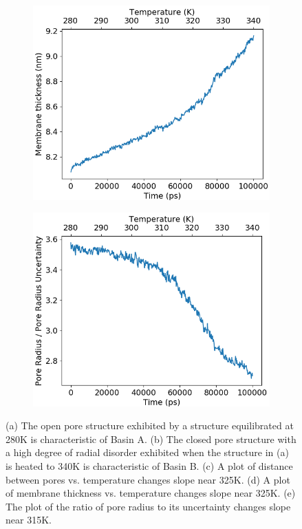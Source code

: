 \documentclass{article}
\begin{document}
\begin{figure}[!ht]
\begin{subfigure}[b]{0.325\textwidth}
                \includegraphics[width=\textwidth]{thickness_tramp.png}

                \caption{}\label{fig:thickness_tramp}
        \end{subfigure}
        \begin{subfigure}[b]{0.325\textwidth}
                \centering
                \includegraphics[width=\textwidth]{order_tramp.png}
                \caption{}\label{fig:order_tramp}
        \end{subfigure}
        \caption{(a) The open pore structure exhibited by a structure equilibrated
        at 280K is characteristic of Basin A. (b) The closed pore structure with
        a high degree of radial disorder exhibited when the structure in (a) is
        heated to 340K is characteristic of Basin B. (c) A plot of distance between pores
        vs. temperature changes slope near 325K. (d) A plot of membrane thickness vs.
        temperature changes slope near 325K. (e) The plot of the ratio of pore radius to
        its uncertainty changes slope near 315K.}\label{fig:tramp}
  \end{figure}
\end{document}
